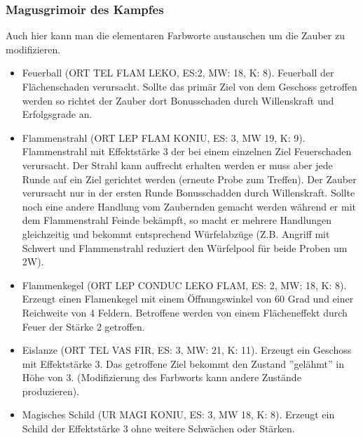 \documentclass{article}
\begin{document}
\subsubsection{Magusgrimoir des Kampfes}

Auch hier kann man die elementaren Farbworte austauschen um die Zauber zu modifizieren.

\begin{itemize}
\item Feuerball (ORT TEL FLAM LEKO, ES:2, MW: 18, K: 8). Feuerball der Flächenschaden verursacht. Sollte das primär Ziel von dem Geschoss getroffen werden so richtet der Zauber dort Bonusschaden durch Willenskraft und Erfolgsgrade an.
\end{itemize}

\begin{itemize}
\item Flammenstrahl (ORT LEP FLAM KONIU, ES: 3, MW 19, K: 9). Flammenstrahl mit Effektstärke 3 der bei einem einzelnen Ziel Feuerschaden verursacht. Der Strahl kann auffrecht erhalten werden er muss aber jede Runde auf ein Ziel gerichtet werden (erneute Probe zum Treffen). Der Zauber verursacht nur in der ersten Runde Bonusschadden durch Willenskraft. Sollte noch eine andere Handlung vom Zaubernden gemacht werden während er mit dem Flammenstrahl Feinde bekämpft, so macht er mehrere Handlungen gleichzeitig und bekommt entsprechend Würfelabzüge (Z.B. Angriff mit Schwert und Flammenstrahl reduziert den Würfelpool für beide Proben um 2W).
\end{itemize}

\begin{itemize}
\item Flammenkegel (ORT LEP CONDUC LEKO FLAM, ES: 2, MW: 18, K: 8). Erzeugt einen Flamenkegel mit einem Öffnungswinkel von 60 Grad und einer Reichweite von 4 Feldern. Betroffene werden von einem Flächeneffekt durch Feuer der Stärke 2 getroffen.
\end{itemize}

\begin{itemize}
\item Eislanze (ORT TEL VAS FIR, ES: 3, MW: 21, K: 11). Erzeugt ein Geschoss mit Effektstärke 3. Das getroffene Ziel bekommt den Zustand ''gelähmt'' in Höhe von 3. (Modifizierung des Farbworts kann andere Zustände produzieren).
\end{itemize}

\begin{itemize}
\item Magisches Schild (UR MAGI KONIU, ES: 3, MW 18, K: 8). Erzeugt ein Schild der Effektstärke 3 ohne weitere Schwächen oder Stärken.
\end{itemize}
\end{document}

